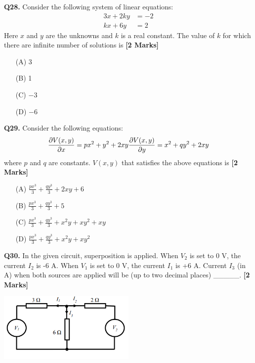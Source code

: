 \documentclass[11pt]{article}
\newcommand{\questionb}[2]{
    \noindent\textbf{Q#2.} #1 \hfill \textbf{[2 Marks]}
}
\begin{document}
\questionb{Consider the following system of linear equations:
\[
\begin{aligned}
3x + 2ky &= -2 \\
kx + 6y &= 2
\end{aligned}
\]
Here \(x\) and \(y\) are the unknowns and \(k\) is a real constant. The value of \(k\) for which there are infinite number of solutions is}{28}
\begin{enumerate}
    \item[(A)] 3
    \item[(B)] 1
    \item[(C)] \(-3\)
    \item[(D)] \(-6\)
\end{enumerate}
\vspace{0.5cm}

\questionb{Consider the following equations:
\[
\frac{\partial V(x, y)}{\partial x} = px^2 + y^2 + 2xy \\
\frac{\partial V(x, y)}{\partial y} = x^2 + qy^2 + 2xy
\]
where \(p\) and \(q\) are constants. \(V(x, y)\) that satisfies the above equations is}{29}
\begin{enumerate}
    \item[(A)] \(\frac{p x^3}{3} + \frac{q y^3}{3} + 2xy + 6\)
    \item[(B)] \(\frac{p x^3}{3} + \frac{q y^3}{3} + 5\)
    \item[(C)] \(\frac{p x^3}{3} + \frac{q y^3}{3} + x^2 y + x y^2 + xy\)
    \item[(D)] \(\frac{p x^3}{3} + \frac{q y^3}{3} + x^2 y + x y^2\)
\end{enumerate}
\vspace{0.5cm}

\questionb{In the given circuit, superposition is applied. When \(V_2\) is set to 0 V, the current \(I_2\) is -6 A. When \(V_1\) is set to 0 V, the current \(I_1\) is +6 A. Current \(I_3\) (in A) when both sources are applied will be (up to two decimal places) \_\_\_\_\_.}{30}
\begin{center}
\includegraphics[width=0.5\textwidth]{figures/30.png}
\end{center}
\vspace{0.5cm}
\end{document}
